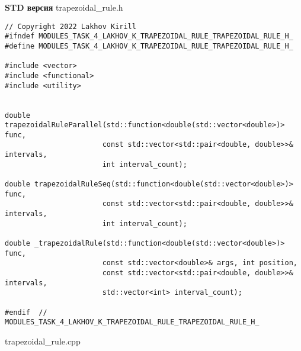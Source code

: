 \documentclass{report}
\begin{document}
\textbf{STD версия}
\newline
\newline trapezoidal\_rule.h
\begin{lstlisting}
// Copyright 2022 Lakhov Kirill
#ifndef MODULES_TASK_4_LAKHOV_K_TRAPEZOIDAL_RULE_TRAPEZOIDAL_RULE_H_
#define MODULES_TASK_4_LAKHOV_K_TRAPEZOIDAL_RULE_TRAPEZOIDAL_RULE_H_

#include <vector>
#include <functional>
#include <utility>


double trapezoidalRuleParallel(std::function<double(std::vector<double>)> func,
                       const std::vector<std::pair<double, double>>& intervals,
                       int interval_count);

double trapezoidalRuleSeq(std::function<double(std::vector<double>)> func,
                       const std::vector<std::pair<double, double>>& intervals,
                       int interval_count);

double _trapezoidalRule(std::function<double(std::vector<double>)> func,
                       const std::vector<double>& args, int position,
                       const std::vector<std::pair<double, double>>& intervals,
                       std::vector<int> interval_count);

#endif  // MODULES_TASK_4_LAKHOV_K_TRAPEZOIDAL_RULE_TRAPEZOIDAL_RULE_H_
\end{lstlisting}
trapezoidal\_rule.cpp
\end{document}
